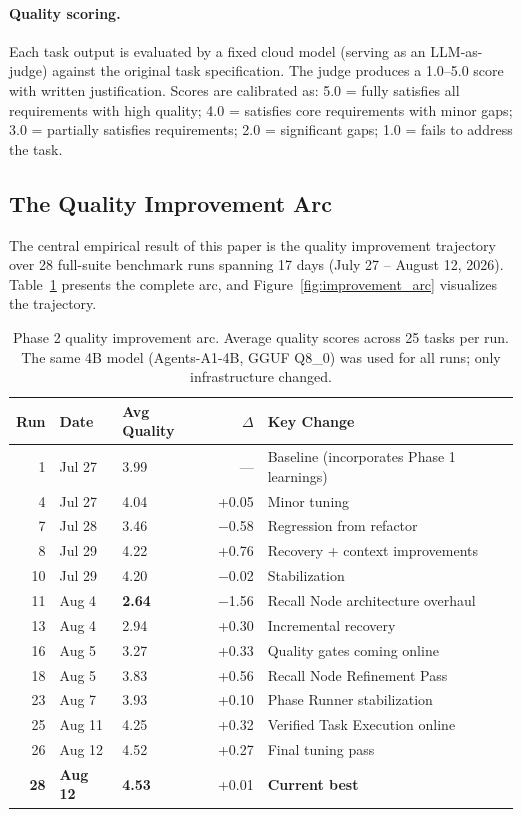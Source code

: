 \documentclass{article}
\begin{document}
\paragraph{Quality scoring.}
Each task output is evaluated by a fixed cloud model (serving as an LLM-as-judge) against the original task specification.
The judge produces a 1.0--5.0 score with written justification.
Scores are calibrated as: 5.0 = fully satisfies all requirements with high quality; 4.0 = satisfies core requirements with minor gaps; 3.0 = partially satisfies requirements; 2.0 = significant gaps; 1.0 = fails to address the task.

\subsection{The Quality Improvement Arc}
\label{sec:eval_quality_arc}

The central empirical result of this paper is the quality improvement trajectory over 28 full-suite benchmark runs spanning 17 days (July 27 -- August 12, 2026).
Table~\ref{tab:phase2_arc} presents the complete arc, and Figure~\ref{fig:improvement_arc} visualizes the trajectory.

\begin{table}[h]
\centering
\caption{Phase 2 quality improvement arc. Average quality scores across 25 tasks per run. The same 4B model (Agents-A1-4B, GGUF Q8\_0) was used for all runs; only infrastructure changed.}
\label{tab:phase2_arc}
\small
\begin{tabular}{@{}rllrl@{}}
\toprule
\textbf{Run} & \textbf{Date} & \textbf{Avg Quality} & \textbf{$\Delta$} & \textbf{Key Change} \\
\midrule
1 & Jul 27 & 3.99 & --- & Baseline (incorporates Phase 1 learnings) \\
4 & Jul 27 & 4.04 & +0.05 & Minor tuning \\
7 & Jul 28 & 3.46 & $-$0.58 & Regression from refactor \\
8 & Jul 29 & 4.22 & +0.76 & Recovery + context improvements \\
10 & Jul 29 & 4.20 & $-$0.02 & Stabilization \\
\midrule
11 & Aug 4 & \textbf{2.64} & $-$1.56 & Recall Node architecture overhaul \\
13 & Aug 4 & 2.94 & +0.30 & Incremental recovery \\
16 & Aug 5 & 3.27 & +0.33 & Quality gates coming online \\
18 & Aug 5 & 3.83 & +0.56 & Recall Node Refinement Pass \\
\midrule
23 & Aug 7 & 3.93 & +0.10 & Phase Runner stabilization \\
25 & Aug 11 & 4.25 & +0.32 & Verified Task Execution online \\
26 & Aug 12 & 4.52 & +0.27 & Final tuning pass \\
\textbf{28} & \textbf{Aug 12} & \textbf{4.53} & +0.01 & \textbf{Current best} \\
\bottomrule
\end{tabular}
\end{table}
\end{document}
